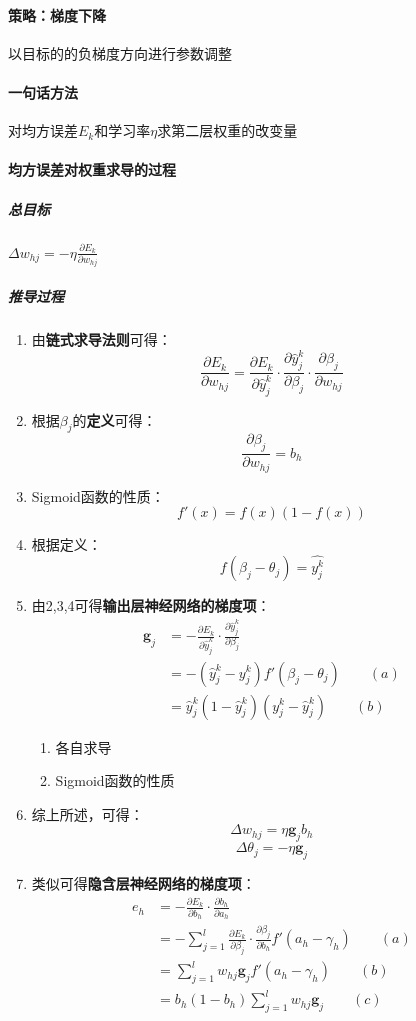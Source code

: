 \documentclass[UTF8]{ctexart}
\begin{document}
\paragraph{策略：梯度下降}
以目标的的负梯度方向进行参数调整
\paragraph{一句话方法}
对均方误差$E_k$和学习率$\eta$求第二层权重的改变量
\paragraph{均方误差对权重求导的过程}
\subparagraph{总目标}
$\varDelta w_{hj} = -\eta \frac{\partial E_k}{\partial w_{hj}}$
\subparagraph{推导过程}
\begin{enumerate}
	\item 由{\bfseries 链式求导法则}可得：$$\frac{\partial E_k}{\partial w_{hj}} = \frac{\partial E_k}{\partial \hat{y}_j^k} \cdot \frac{\partial \hat{y}_j^k}{\partial \beta_j} \cdot \frac{\partial \beta_j}{\partial w_{hj}}$$
	\item 根据$\beta_j$的{\bfseries 定义}可得：$$\frac{\partial \beta_j}{\partial w_{hj}} = b_h$$
	\item Sigmoid函数的性质：$$f'(x) = f(x)(1 - f(x))$$
	\item 根据定义：$$f(\beta_j - \theta_j) = \hat{y_j^k}$$
	\item 由2,3,4可得{\bfseries 输出层神经网络的梯度项}：$$\begin{aligned} \pmb g_j &= -\frac{\partial E_k}{\partial \hat{y}_j^k} \cdot \frac{\partial \hat{y}_j^k}{\partial \beta_j} \\ &= -(\hat{y}_j^k - {y_j^k})f'(\beta_j - \theta_j) \qquad (a) \\ &= \hat{y}_j^k(1 - \hat{y}_j^k)({y_j^k} - \hat{y}_j^k) \qquad (b) \end{aligned}$$ \begin{enumerate}
		\item 各自求导
		\item Sigmoid函数的性质
	\end{enumerate}
	\item 综上所述，可得：$$\varDelta w_{hj} = \eta\pmb g_jb_h$$ $$\varDelta\theta_j = -\eta\pmb g_j$$
	\item 类似可得{\bfseries 隐含层神经网络的梯度项}：$$\begin{aligned} e_h &= - \frac{\partial E_k}{\partial b_h} \cdot \frac{\partial b_h}{\partial a_h} \\ & = -\sum_{j=1}^l \frac{\partial E_k}{\partial \beta_j} \cdot \frac{\partial \beta_j}{\partial b_h} f'(a_h-\gamma_h) \qquad (a)\\ & = \sum_{j=1}^lw_{hj}\pmb g_j f'(a_h - \gamma_h)\qquad (b) \\ & = b_h(1 - b_h)\sum_{j=1}^lw_{hj}\pmb g_j \qquad (c) \end{aligned}$$ \begin{enumerate}

\end{enumerate}
\end{enumerate}
\end{document}
